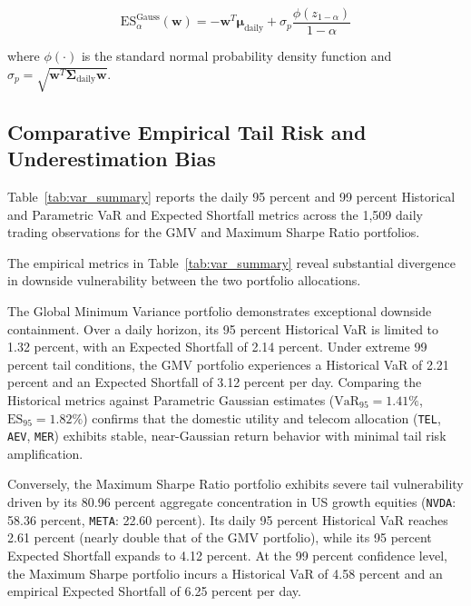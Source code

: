 \begin{equation}
  \text{ES}_\alpha^{\text{Gauss}}(\mathbf{w}) = -\mathbf{w}^T \boldsymbol{\mu}_{\text{daily}} + \sigma_p \frac{\phi(z_{1-\alpha})}{1 - \alpha}
\end{equation}

where $\phi(\cdot)$ is the standard normal probability density function and $\sigma_p = \sqrt{\mathbf{w}^T \boldsymbol{\Sigma}_{\text{daily}} \mathbf{w}}$.

\subsection{Comparative Empirical Tail Risk and Underestimation Bias}

Table~\ref{tab:var_summary} reports the daily 95 percent and 99 percent Historical and Parametric VaR and Expected Shortfall metrics across the 1,509 daily trading observations for the GMV and Maximum Sharpe Ratio portfolios.



The empirical metrics in Table~\ref{tab:var_summary} reveal substantial divergence in downside vulnerability between the two portfolio allocations.

The Global Minimum Variance portfolio demonstrates exceptional downside containment. Over a daily horizon, its 95 percent Historical VaR is limited to 1.32 percent, with an Expected Shortfall of 2.14 percent. Under extreme 99 percent tail conditions, the GMV portfolio experiences a Historical VaR of 2.21 percent and an Expected Shortfall of 3.12 percent per day. Comparing the Historical metrics against Parametric Gaussian estimates ($\text{VaR}_{95} = 1.41\%$, $\text{ES}_{95} = 1.82\%$) confirms that the domestic utility and telecom allocation (\texttt{TEL}, \texttt{AEV}, \texttt{MER}) exhibits stable, near-Gaussian return behavior with minimal tail risk amplification.

Conversely, the Maximum Sharpe Ratio portfolio exhibits severe tail vulnerability driven by its 80.96 percent aggregate concentration in US growth equities (\texttt{NVDA}: 58.36 percent, \texttt{META}: 22.60 percent). Its daily 95 percent Historical VaR reaches 2.61 percent (nearly double that of the GMV portfolio), while its 95 percent Expected Shortfall expands to 4.12 percent. At the 99 percent confidence level, the Maximum Sharpe portfolio incurs a Historical VaR of 4.58 percent and an empirical Expected Shortfall of 6.25 percent per day.

